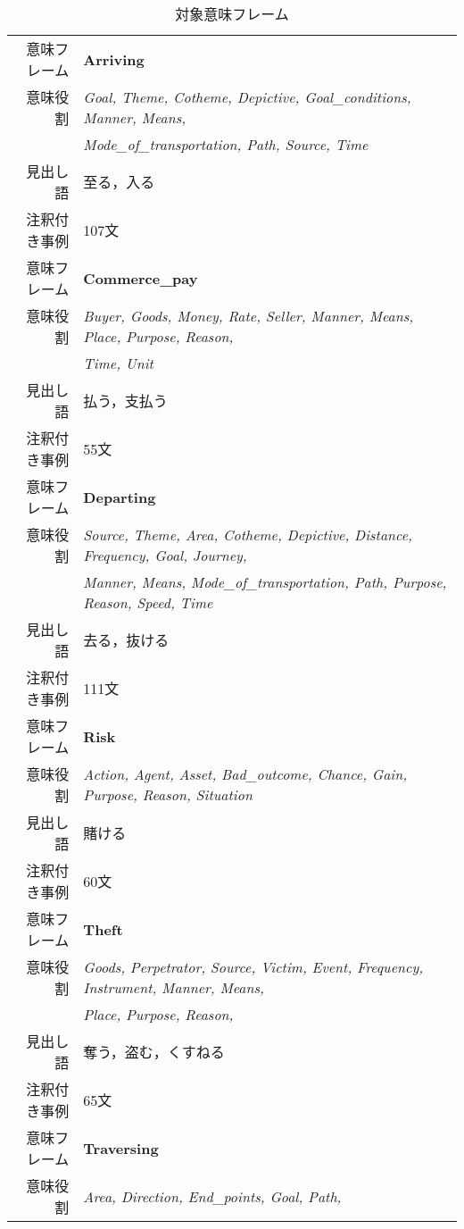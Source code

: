 \documentclass[japanese]{jnlp_1.2b}
\begin{document}
\begin{table}[t]
\setlength{\baselineskip}{13pt}
 \begin{center}
  \caption{対象意味フレーム}
  \label{tbl:domain_experiment}
  \begin{tabular}{rl}
   \hline
   意味フレーム & {\bf Arriving} \\
   意味役割 & {\it Goal, Theme, Cotheme, Depictive, Goal\_conditions,
   Manner, Means,}\\
            & {\it Mode\_of\_transportation, Path, Source, Time} \\
   見出し語 & 至る，入る \\
   注釈付き事例 & 107文 \\
   \hline
   意味フレーム & {\bf Commerce\_pay} \\
   意味役割 & {\it Buyer, Goods, Money, Rate, Seller, Manner, Means,
   Place, Purpose, Reason,}\\
            & {\it Time, Unit} \\
   見出し語 & 払う，支払う \\
   注釈付き事例 & 55文 \\
   \hline
   意味フレーム & {\bf Departing} \\
   意味役割 & {\it Source, Theme, Area, Cotheme, Depictive, Distance,
   Frequency, Goal, Journey,}\\
            & {\it Manner, Means, Mode\_of\_transportation, Path,
   Purpose, Reason, Speed, Time} \\
   見出し語 & 去る，抜ける \\
   注釈付き事例 & 111文 \\
   \hline
   意味フレーム & {\bf Risk} \\
   意味役割 & {\it Action, Agent, Asset, Bad\_outcome, Chance, Gain,
   Purpose, Reason, Situation} \\
   見出し語 & 賭ける \\
   注釈付き事例 & 60文 \\
   \hline
   意味フレーム & {\bf Theft} \\
   意味役割 & {\it Goods, Perpetrator, Source, Victim, Event, Frequency,
   Instrument, Manner, Means,}\\
            & {\it Place, Purpose, Reason,} \\
   見出し語 & 奪う，盗む，くすねる \\
   注釈付き事例 & 65文 \\
   \hline
   意味フレーム & {\bf Traversing} \\
   意味役割 & {\it Area, Direction, End\_points, Goal, Path,
}
\end{tabular}
\end{center}
\end{table}
\end{document}

